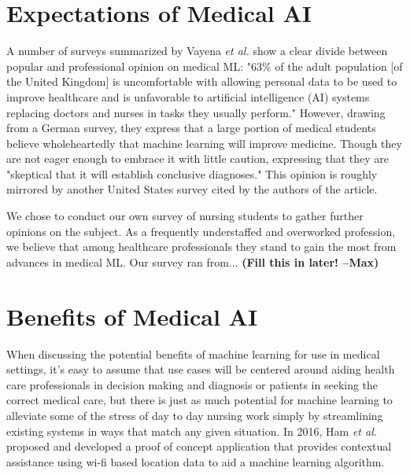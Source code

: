 \documentclass[]{article}
\begin{document}
	\section{Expectations of Medical AI}

		A number of surveys summarized by Vayena \emph{et al.} show a clear divide between popular and professional opinion on medical ML: "63\% of the adult population [of the United Kingdom] is uncomfortable with allowing personal data to be used to improve healthcare and is unfavorable to artificial intelligence (AI) systems replacing doctors and nurses in tasks they usually perform." However, drawing from a German survey, they express that a large portion of medical students believe wholeheartedly that machine learning will improve medicine. Though they are not eager enough to embrace it with little caution, expressing that they are "skeptical that it will establish conclusive diagnoses." This opinion is roughly mirrored by another United States survey cited by the authors of the article.\cite{Vayena2018}

		We chose to conduct our own survey of nursing students to gather further opinions on the subject. As a frequently understaffed and overworked profession\cite{doi:10.1111/j.1365-2648.2009.05082.x}, we believe that among healthcare professionals they stand to gain the most from advances in medical ML. Our survey ran from... \textbf{(Fill this in later! --Max)}

	\section{Benefits of Medical AI}

		When discussing the potential benefits of machine learning for use in medical settings, it's easy to assume that use cases will be centered around aiding health care professionals in decision making and diagnosis or patients in seeking the correct medical care, but there is just as much potential for machine learning to alleviate some of the stress of day to day nursing work simply by streamlining existing systems in ways that match any given situation. In 2016, Ham \emph{et al.} proposed and developed a proof of concept application that provides contextual assistance using wi-fi based location data to aid a machine learning algorithm.\cite{Ham2017}
\end{document}
